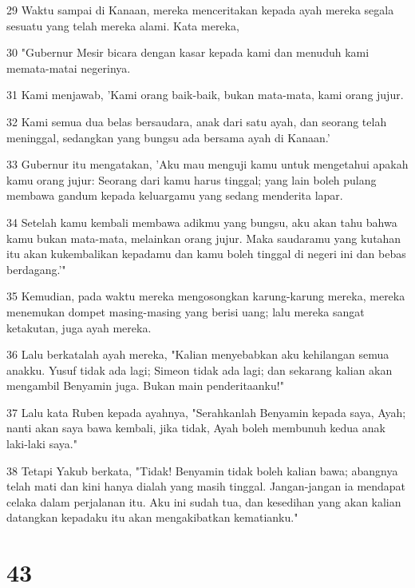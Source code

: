 \par 29 Waktu sampai di Kanaan, mereka menceritakan kepada ayah mereka segala sesuatu yang telah mereka alami. Kata mereka,
\par 30 "Gubernur Mesir bicara dengan kasar kepada kami dan menuduh kami memata-matai negerinya.
\par 31 Kami menjawab, 'Kami orang baik-baik, bukan mata-mata, kami orang jujur.
\par 32 Kami semua dua belas bersaudara, anak dari satu ayah, dan seorang telah meninggal, sedangkan yang bungsu ada bersama ayah di Kanaan.'
\par 33 Gubernur itu mengatakan, 'Aku mau menguji kamu untuk mengetahui apakah kamu orang jujur: Seorang dari kamu harus tinggal; yang lain boleh pulang membawa gandum kepada keluargamu yang sedang menderita lapar.
\par 34 Setelah kamu kembali membawa adikmu yang bungsu, aku akan tahu bahwa kamu bukan mata-mata, melainkan orang jujur. Maka saudaramu yang kutahan itu akan kukembalikan kepadamu dan kamu boleh tinggal di negeri ini dan bebas berdagang.'"
\par 35 Kemudian, pada waktu mereka mengosongkan karung-karung mereka, mereka menemukan dompet masing-masing yang berisi uang; lalu mereka sangat ketakutan, juga ayah mereka.
\par 36 Lalu berkatalah ayah mereka, "Kalian menyebabkan aku kehilangan semua anakku. Yusuf tidak ada lagi; Simeon tidak ada lagi; dan sekarang kalian akan mengambil Benyamin juga. Bukan main penderitaanku!"
\par 37 Lalu kata Ruben kepada ayahnya, "Serahkanlah Benyamin kepada saya, Ayah; nanti akan saya bawa kembali, jika tidak, Ayah boleh membunuh kedua anak laki-laki saya."
\par 38 Tetapi Yakub berkata, "Tidak! Benyamin tidak boleh kalian bawa; abangnya telah mati dan kini hanya dialah yang masih tinggal. Jangan-jangan ia mendapat celaka dalam perjalanan itu. Aku ini sudah tua, dan kesedihan yang akan kalian datangkan kepadaku itu akan mengakibatkan kematianku."

\chapter{43}

